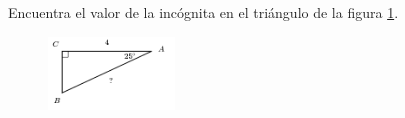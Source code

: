 Encuentra el valor de la incógnita en el triángulo de la figura \ref{fig:lados_functrig_30}.
\begin{figure}[H]
    \begin{center}
        \includegraphics[width=0.3\textwidth]{../images/lados_functrig_30.png}
    \end{center}
    \caption{}
    \label{fig:lados_functrig_30}
\end{figure}